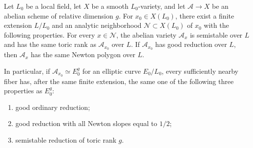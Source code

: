 \begin{proposition}
\label{loc:constancy}
Let $L_0$ be a local field, let $X$ be a smooth $L_0$-variety, and let
$\mathcal A\to X$ be an abelian scheme of relative dimension $g$.
For $x_0\in X(L_0)$, there exist a finite extension $L/L_0$ and an analytic
neighborhood $\mathcal N\subset X(L_0)$ of $x_0$ with the following
properties.  For every $x\in\mathcal N$, the abelian variety
$\mathcal A_x$ is semistable over $L$ and has the same toric rank as
$\mathcal A_{x_0}$ over $L$.  If $\mathcal A_{x_0}$ has good reduction
over $L$, then $\mathcal A_x$ has the same Newton polygon over $L$.

In particular, if $\mathcal A_{x_0}\simeq E_0^g$ for an elliptic curve
$E_0/L_0$, every sufficiently nearby fiber has, after the same finite
extension, the same one of the following three properties as $E_0^g$:
\begin{enumerate}
\item good ordinary reduction;
\item good reduction with all Newton slopes equal to $1/2$;
\item semistable reduction of toric rank $g$.
\end{enumerate}
\end{proposition}

